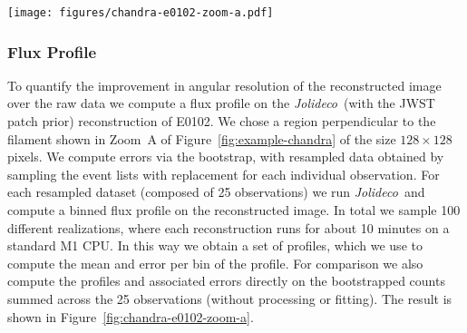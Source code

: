 \documentclass[twocolumn, linenumbers]{aastex631}
\newcommand{\jolideco}{\textit{Jolideco}~}
\begin{document}
    \begin{figure*}
        \begin{centering}
            \texttt{[image: figures/chandra-e0102-zoom-a.pdf]}
            \caption{
                The left panel shows the deconvolved flux and counts profile of the region illustrated in the right panel. The thick solid and dashed lines represent the mean across the 100 bootstrap-resampled datasets. The counts profile for each bootstrapped dataset is summed (stacked) across the 25 observations per dataset, while the \jolideco profile is computed from a single joint reconstruction based on all 25 observations. The variability across the 100 bootstrapped datasets is represented by the $3\sigma$ error bands, shown transparent in the background for both profiles. Both profiles are normalized such that they integrate to unity and are aligned such that the position of their peak coincides. 
            }
            \label{fig:chandra-e0102-zoom-a}
        \end{centering}
    \end{figure*}
    
    \subsubsection{Flux Profile}
    To quantify the improvement in angular resolution of the reconstructed image over the raw data we compute a flux profile on the \jolideco (with the JWST patch prior) reconstruction of E0102. We chose a region perpendicular to the filament shown in Zoom~A of Figure~\ref{fig:example-chandra} of the size $128\times128$ pixels. We compute errors via the bootstrap, with resampled data obtained by sampling the event lists with replacement for each individual observation. For each resampled dataset (composed of 25 observations) we run \jolideco and compute a binned flux profile on the reconstructed image. In total we sample 100 different realizations, where each reconstruction runs for about 10 minutes on a standard M1 CPU. In this way we obtain a set of profiles, which we use to compute the mean and error per bin of the profile. For comparison we also compute the profiles and associated errors directly on the bootstrapped counts summed across the 25 observations (without processing or fitting). The result is shown in Figure~\ref{fig:chandra-e0102-zoom-a}.
\end{document}
